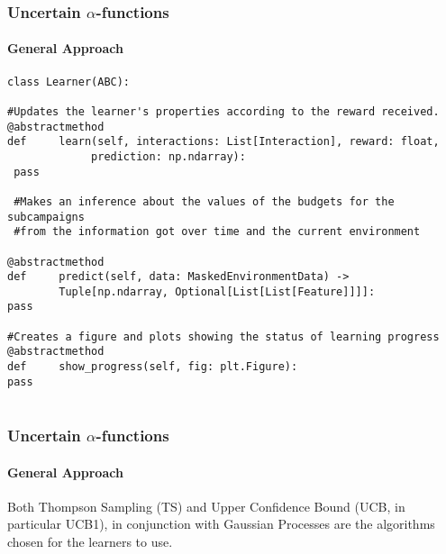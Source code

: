 \documentclass[11pt]{beamer}
\begin{document}
\begin{frame}[fragile]

\frametitle{Uncertain $\alpha$-functions}
\framesubtitle{General Approach}

%
%



\begin{lstlisting}[style=Python, basicstyle=\tiny, numbers=none, framexrightmargin=-20pt]
class Learner(ABC):

#Updates the learner's properties according to the reward received.
@abstractmethod
def     learn(self, interactions: List[Interaction], reward: float,
             prediction: np.ndarray):
 pass

 #Makes an inference about the values of the budgets for the subcampaigns
 #from the information got over time and the current environment

@abstractmethod 
def     predict(self, data: MaskedEnvironmentData) -> 
        Tuple[np.ndarray, Optional[List[List[Feature]]]]: 
pass

#Creates a figure and plots showing the status of learning progress
@abstractmethod 
def     show_progress(self, fig: plt.Figure):
pass
    
\end{lstlisting}

\end{frame}


\begin{frame}

\frametitle{Uncertain $\alpha$-functions}
\framesubtitle{General Approach}

Both Thompson Sampling (TS) and Upper Confidence Bound (UCB, in particular UCB1), in conjunction with Gaussian Processes are the algorithms chosen for the learners to use.


\end{frame}
\end{document}
